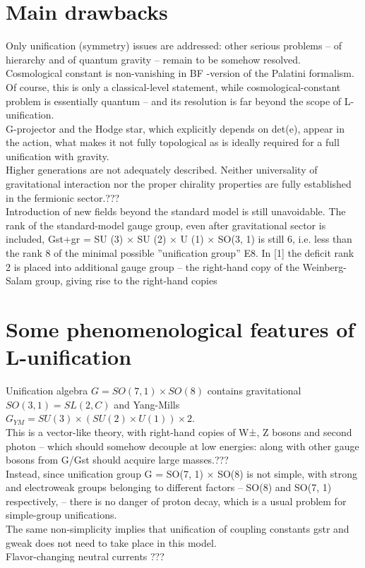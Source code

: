 \documentclass{article}
\begin{document}
\section{Main drawbacks}
Only unification (symmetry) issues are addressed: other serious problems – of hierarchy and of quantum
gravity – remain to be somehow resolved. \\
Cosmological constant is non-vanishing in BF -version of the Palatini formalism. Of course, this is only a classical-level statement, while cosmological-constant problem is essentially quantum – and its resolution is far beyond the scope of L-unification. \\
G-projector and the Hodge star, which explicitly depends on det(e), appear in the action, what makes it not fully topological as is ideally required for a full unification with gravity. \\
Higher generations are not adequately described. Neither universality of gravitational interaction nor the proper chirality properties are fully established in the fermionic sector.??? \\
Introduction of new fields beyond the standard model is still unavoidable. The rank of the standard-model gauge group, even after gravitational sector is included, Gst+gr = SU (3) × SU (2) × U (1) × SO(3, 1) is still 6, i.e. less than the rank 8 of the minimal possible ”unification group” E8. In [1] the deficit rank 2 is placed into additional gauge group – the right-hand copy of the Weinberg-Salam group, giving rise to the right-hand copies \\

\section{Some phenomenological features of L-unification}
Unification algebra $G = SO(7, 1) \times SO(8)$ contains gravitational $SO(3, 1) = SL(2, C)$ and Yang-Mills $G_{YM} = SU (3) × (SU (2) \times U (1)) \times 2$. \\
This is a vector-like theory, with right-hand copies of W±, Z bosons and second photon – which should
somehow decouple at low energies: along with other gauge bosons from G/Gst should acquire large masses.??? \\
Instead, since unification group G = SO(7, 1) × SO(8) is not simple, with strong and electroweak groups
belonging to different factors – SO(8) and SO(7, 1) respectively, – there is no danger of proton decay, which is a usual problem for simple-group unifications. \\
The same non-simplicity implies that unification of coupling constants gstr and gweak does not need to
take place in this model. \\
Flavor-changing neutral currents ??? \\
\end{document}
